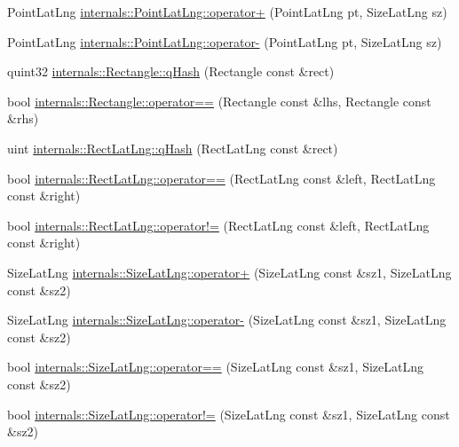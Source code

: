 \begin{DoxyCompactItemize}
\item 
\-Point\-Lat\-Lng \hyperlink{group___o_p_map_widget_ga488020cfd021f98e4856f128d9448367}{internals\-::\-Point\-Lat\-Lng\-::operator+} (\-Point\-Lat\-Lng pt, \-Size\-Lat\-Lng sz)
\item 
\-Point\-Lat\-Lng \hyperlink{group___o_p_map_widget_ga7af0e8545fa560e7264f0c7cedae458b}{internals\-::\-Point\-Lat\-Lng\-::operator-\/} (\-Point\-Lat\-Lng pt, \-Size\-Lat\-Lng sz)
\item 
quint32 \hyperlink{group___o_p_map_widget_ga147a59b523f242e2fe2549b016688b2c}{internals\-::\-Rectangle\-::q\-Hash} (\-Rectangle const \&rect)
\item 
bool \hyperlink{group___o_p_map_widget_ga49a8cb6dd0aff741dcae36e54dedd8be}{internals\-::\-Rectangle\-::operator==} (\-Rectangle const \&lhs, \-Rectangle const \&rhs)
\item 
uint \hyperlink{group___o_p_map_widget_ga67b89136c8dd499f5081ea9c95aeed4b}{internals\-::\-Rect\-Lat\-Lng\-::q\-Hash} (\-Rect\-Lat\-Lng const \&rect)
\item 
bool \hyperlink{group___o_p_map_widget_ga1a6afef3d18a3e0a340d1d9dfe632a6a}{internals\-::\-Rect\-Lat\-Lng\-::operator==} (\-Rect\-Lat\-Lng const \&left, \-Rect\-Lat\-Lng const \&right)
\item 
bool \hyperlink{group___o_p_map_widget_ga3259b80d8473418ef75be3a72b243e2a}{internals\-::\-Rect\-Lat\-Lng\-::operator!=} (\-Rect\-Lat\-Lng const \&left, \-Rect\-Lat\-Lng const \&right)
\item 
\-Size\-Lat\-Lng \hyperlink{group___o_p_map_widget_ga398e0bae9b1c31e141e49ea14f960ad3}{internals\-::\-Size\-Lat\-Lng\-::operator+} (\-Size\-Lat\-Lng const \&sz1, \-Size\-Lat\-Lng const \&sz2)
\item 
\-Size\-Lat\-Lng \hyperlink{group___o_p_map_widget_ga5d0f63cfc6ce4e2c3249697e3156df5e}{internals\-::\-Size\-Lat\-Lng\-::operator-\/} (\-Size\-Lat\-Lng const \&sz1, \-Size\-Lat\-Lng const \&sz2)
\item 
bool \hyperlink{group___o_p_map_widget_gabb95545e93acc311be149febe7752b80}{internals\-::\-Size\-Lat\-Lng\-::operator==} (\-Size\-Lat\-Lng const \&sz1, \-Size\-Lat\-Lng const \&sz2)
\item 
bool \hyperlink{group___o_p_map_widget_ga1ee10c15dd9b86cfaf44a95b0bfd5bab}{internals\-::\-Size\-Lat\-Lng\-::operator!=} (\-Size\-Lat\-Lng const \&sz1, \-Size\-Lat\-Lng const \&sz2)
\end{DoxyCompactItemize}


